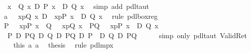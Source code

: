 \begin{isabellebody}
\ {\isachardoublequote}\ {\isasymforall}x{\isachardot}\ {\isasymturnstile}\ Q\ x\ {\isasymlongrightarrow}\isactrlsub D\ P\ x\ \ {\isasymor}\isactrlsub D\ Q\ x{\isachardoublequote}\ \isamarkupfalse%
\ {\isacharparenleft}simp\ add{\isacharcolon}\ pdl{\isacharunderscore}taut{\isacharparenright}\isanewline
\ \ \isamarkupfalse%
\ a{}{\isacharcolon}\ {\isachardoublequote}{\isasymturnstile}\ {\isacharbrackleft}{\isacharhash}\ x{\isasymleftarrow}p{\isacharbrackright}{\isacharparenleft}Q\ x{\isacharparenright}\ {\isasymlongrightarrow}\isactrlsub D\ {\isacharbrackleft}{\isacharhash}\ x{\isasymleftarrow}p{\isacharbrackright}{\isacharparenleft}P\ x\ \ {\isasymor}\isactrlsub D\ Q\ x{\isacharparenright}{\isachardoublequote}\ \isamarkupfalse%
\ {\isacharparenleft}rule\ pdl{\isacharunderscore}box{\isacharunderscore}reg{\isacharparenright}\isanewline
\ \ \isamarkupfalse%
\ {\isacharquery}P\ {\isacharequal}\ {\isachardoublequote}{\isacharbrackleft}{\isacharhash}\ x{\isasymleftarrow}p{\isacharbrackright}{\isacharparenleft}P\ x{\isacharparenright}{\isachardoublequote}\ \ {\isacharquery}Q\ {\isacharequal}\ {\isachardoublequote}{\isacharbrackleft}{\isacharhash}\ x{\isasymleftarrow}p{\isacharbrackright}{\isacharparenleft}Q\ x{\isacharparenright}{\isachardoublequote}\ \ {\isacharquery}PQ\ {\isacharequal}\ {\isachardoublequote}{\isacharbrackleft}{\isacharhash}\ x{\isasymleftarrow}p{\isacharbrackright}{\isacharparenleft}P\ x\ \ {\isasymor}\isactrlsub D\ Q\ x{\isacharparenright}{\isachardoublequote}\isanewline
\ \ \isamarkupfalse%
\ {\isachardoublequote}{\isasymturnstile}\ {\isacharparenleft}{\isacharquery}P\ {\isasymlongrightarrow}\isactrlsub D\ {\isacharquery}PQ{\isacharparenright}\ {\isasymlongrightarrow}\isactrlsub D\ {\isacharparenleft}{\isacharquery}Q\ {\isasymlongrightarrow}\isactrlsub D\ {\isacharquery}PQ{\isacharparenright}\ {\isasymlongrightarrow}\isactrlsub D\ {\isacharparenleft}{\isacharquery}P\ \ {\isasymor}\isactrlsub D\ {\isacharquery}Q\ {\isasymlongrightarrow}\isactrlsub D\ {\isacharquery}PQ{\isacharparenright}{\isachardoublequote}\isanewline
\ \ \ \ \isamarkupfalse%
\ {\isacharparenleft}simp\ only{\isacharcolon}\ pdl{\isacharunderscore}taut\ Valid{\isacharunderscore}Ret{\isacharparenright}\isanewline
\ \ \isamarkupfalse%
\ this\ a{}\ a{}\ \isamarkupfalse%
\ {\isacharquery}thesis\ \isamarkupfalse%
\ {\isacharparenleft}rule\ pdl{\isacharunderscore}mp{\isacharunderscore}{}x{\isacharparenright}\isanewline
\isamarkupfalse%
\isanewline
\isanewline
\isamarkupfalse%
\isanewline
\isamarkupfalse%
\end{isabellebody}%
